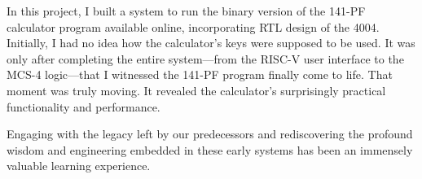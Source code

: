 \documentclass[dvipdfmx, a4paper,12pt]{book}
\begin{document}
In this project, I built a system to run the binary version of the 141-PF calculator program available online, incorporating RTL design of the 4004. Initially, I had no idea how the calculator's keys were supposed to be used. It was only after completing the entire system—from the RISC-V user interface to the MCS-4 logic—that I witnessed the 141-PF program finally come to life. That moment was truly moving. It revealed the calculator's surprisingly practical functionality and performance.

Engaging with the legacy left by our predecessors and rediscovering the profound wisdom and engineering embedded in these early systems has been an immensely valuable learning experience.




\backmatter
\newpage\chapter{}

\end{document}

